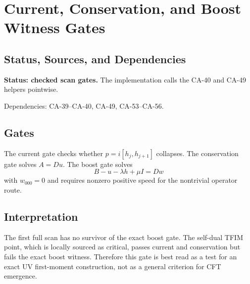 
\section{Current, Conservation, and Boost Witness Gates}
\label{sec:qubit-algebraic-scan-gates}

\subsection{Status, Sources, and Dependencies}

\textbf{Status: checked scan gates.}  The implementation calls the CA-40 and
CA-49 helpers pointwise.

Dependencies: CA-39--CA-40, CA-49, CA-53--CA-56.


\subsection{Gates}

The current gate checks whether \(p=i[h_j,h_{j+1}]\) collapses.  The
conservation gate solves \(A=Du\).  The boost gate solves
\[
  B-u-\lambda h+\mu I=Dw
\]
with \(w_{000}=0\) and requires nonzero positive speed for the nontrivial
operator route.

\subsection{Interpretation}

The first full scan has no survivor of the exact boost gate.  The self-dual
TFIM point, which is locally sourced as critical, passes current and
conservation but fails the exact boost witness.  Therefore this gate is best
read as a test for an exact UV first-moment construction, not as a general
criterion for CFT emergence.
